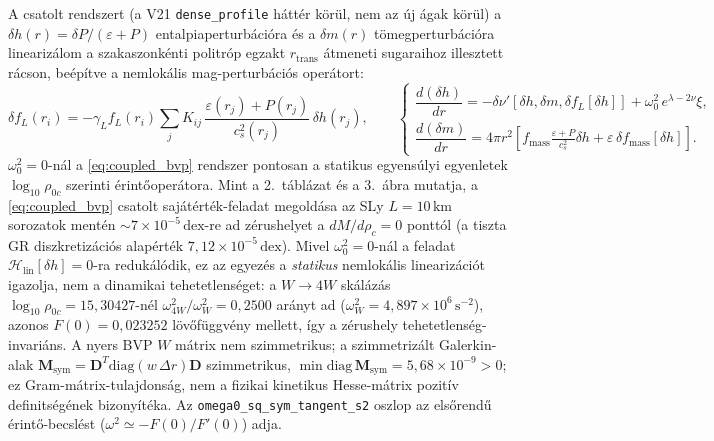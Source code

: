 \documentclass[10pt,a4paper]{article}
\begin{document}
A csatolt rendszert (a V21 \texttt{dense\_profile} háttér körül, nem az új ágak körül) a $\delta h(r) = \delta P/(\varepsilon+P)$ entalpiaperturbációra és a $\delta m(r)$ tömegperturbációra linearizálom a szakaszonkénti politróp egzakt $r_{\text{trans}}$ átmeneti sugaraihoz illesztett rácson, beépítve a nemlokális mag-perturbációs operátort:
\begin{equation}
  \delta f_L(r_i) = -\gamma_L f_L(r_i)\sum_j K_{ij}\,\frac{\varepsilon(r_j)+P(r_j)}{c_s^2(r_j)}\,\delta h(r_j), \qquad
  \begin{cases}
    \dfrac{d(\delta h)}{dr} = -\delta\nu'\!\left[\delta h, \delta m, \delta f_L[\delta h]\right] + \omega_0^2\,e^{\lambda-2\nu}\xi, \\[4pt]
    \dfrac{d(\delta m)}{dr} = 4\pi r^2\!\left[f_{\text{mass}}\frac{\varepsilon+P}{c_s^2}\delta h + \varepsilon\,\delta f_{\text{mass}}[\delta h]\right].
  \end{cases} \label{eq:coupled_bvp}
\end{equation}
$\omega_0^2 = 0$-nál a \eqref{eq:coupled_bvp} rendszer pontosan a statikus egyensúlyi egyenletek $\log_{10}\rho_{0c}$ szerinti érintőoperátora. Mint a 2.\ táblázat és a 3.\ ábra mutatja, a \eqref{eq:coupled_bvp} csatolt sajátérték-feladat megoldása az SLy $L=10\,\text{km}$ sorozatok mentén $\sim 7\times 10^{-5}\,\text{dex}$-re ad zérushelyet a $dM/d\rho_c=0$ ponttól (a tiszta GR diszkretizációs alapérték $7{,}12\times 10^{-5}\,\text{dex}$). Mivel $\omega_0^2=0$-nál a feladat $\mathcal{H}_{\text{lin}}[\delta h]=0$-ra redukálódik, ez az egyezés a \emph{statikus} nemlokális linearizációt igazolja, nem a dinamikai tehetetlenséget: a $W\to 4W$ skálázás $\log_{10}\rho_{0c}=15{,}30427$-nél $\omega^2_{4W}/\omega^2_W = 0{,}2500$ arányt ad ($\omega^2_W=4{,}897\times 10^{6}\,\text{s}^{-2}$), azonos $F(0)=0{,}023252$ lövőfüggvény mellett, így a zérushely tehetetlenség-invariáns. A nyers BVP $W$ mátrix nem szimmetrikus; a szimmetrizált Galerkin-alak $\mathbf{M}_{\text{sym}} = \mathbf{D}^{T}\mathrm{diag}(w\,\Delta r)\mathbf{D}$ szimmetrikus, $\min\mathrm{diag}\,\mathbf{M}_{\text{sym}} = 5{,}68\times 10^{-9}>0$; ez Gram-mátrix-tulajdonság, nem a fizikai kinetikus Hesse-mátrix pozitív definitségének bizonyítéka. Az \texttt{omega0\_sq\_sym\_tangent\_s2} oszlop az elsőrendű érintő-becslést ($\omega^2\simeq -F(0)/F'(0)$) adja.
\end{document}

